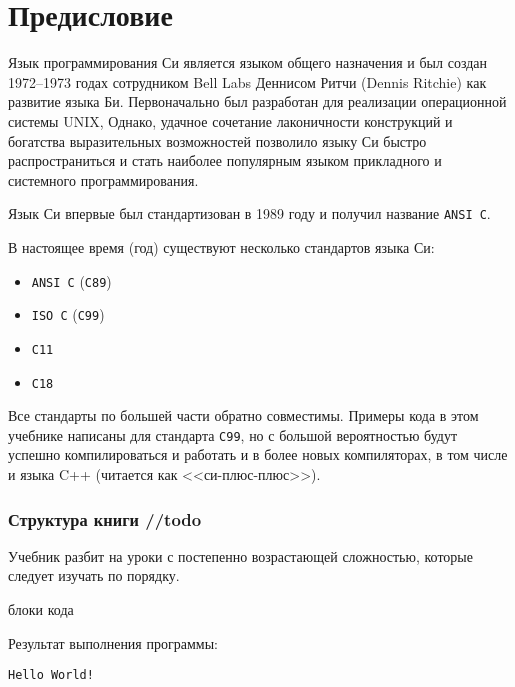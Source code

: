\documentclass[myc.tex]{subfiles}
\begin{document}
\chapter*{Предисловие}

Язык программирования Си является языком общего назначения и был создан 1972--1973 годах сотрудником Bell Labs Деннисом Ритчи (Dennis Ritchie) как развитие языка Би. Первоначально был разработан для реализации операционной системы UNIX, Однако, удачное сочетание лаконичности конструкций и богатства выразительных возможностей позволило языку Си быстро распространиться и стать наиболее популярным языком прикладного и системного программирования.


Язык Си впервые был стандартизован в 1989 году и получил название \texttt{ANSI C}.

В настоящее время (\the\year{ }год) существуют несколько стандартов языка Си:
\begin{itemize}
\item \texttt{ANSI C} (\texttt{C89})
\item \texttt{ISO C} (\texttt{C99})
\item \texttt{C11}
\item \texttt{C18}
\end{itemize}

Все стандарты по большей части обратно совместимы. Примеры кода в этом учебнике написаны для стандарта \texttt{C99}, но с большой вероятностью будут успешно компилироваться и работать и в более новых компиляторах, в том числе и языка C++ (читается как <<си-плюс-плюс>>).





\subsection*{Структура книги //todo}

Учебник разбит на уроки с постепенно возрастающей сложностью, которые следует изучать по порядку.

блоки кода



Результат выполнения программы:
\begin{verbatim}
Hello World!
\end{verbatim} 
\end{document}
